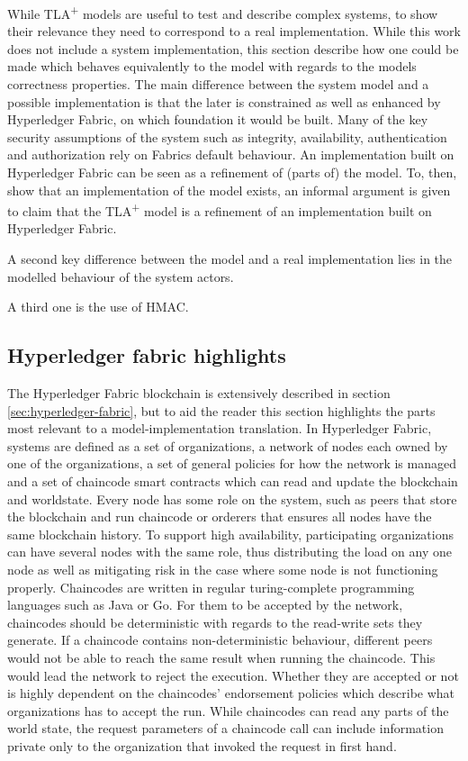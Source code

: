 \documentclass[english, biblatex, digitaloutput]{kththesis}
\begin{document}
While TLA\textsuperscript+ models are useful to test and describe complex systems, to show their relevance they need to correspond to a real implementation. While this work does not include a system implementation, this section describe how one could be made which behaves equivalently to the model with regards to the models correctness properties. The main difference between the system model and a possible implementation is that the later is constrained as well as enhanced by Hyperledger Fabric, on which foundation it would be built. Many of the key security assumptions of the system such as integrity, availability, authentication and authorization rely on Fabrics default behaviour. An implementation built on Hyperledger Fabric can be seen as a refinement of (parts of) the model. To, then, show that an implementation of the model exists, an informal argument is given to claim that the TLA\textsuperscript+ model is a refinement of an implementation built on Hyperledger Fabric.

A second key difference between the model and a real implementation lies in the modelled behaviour of the system actors.

A third one is the use of HMAC.

\subsection{Hyperledger fabric highlights}
\label{subsec:hyperledger-highlights}

The Hyperledger Fabric blockchain is extensively described in section \ref{sec:hyperledger-fabric}, but to aid the reader this section highlights the parts most relevant to a model-implementation translation. In Hyperledger Fabric, systems are defined as a set of organizations, a network of nodes each owned by one of the organizations, a set of general policies for how the network is managed and a set of chaincode smart contracts which can read and update the blockchain and worldstate. Every node has some role on the system, such as peers that store the blockchain and run chaincode or orderers that ensures all nodes have the same blockchain history. To support high availability, participating organizations can have several nodes with the same role, thus distributing the load on any one node as well as mitigating risk in the case where some node is not functioning properly. Chaincodes are written in regular turing-complete programming languages such as Java or Go. For them to be accepted by the network, chaincodes should be deterministic with regards to the read-write sets they generate. If a chaincode contains non-deterministic behaviour, different peers would not be able to reach the same result when running the chaincode. This would lead the network to reject the execution. Whether they are accepted or not is highly dependent on the chaincodes' endorsement policies which describe what organizations has to accept the run. While chaincodes can read any parts of the world state, the request parameters of a chaincode call can include information private only to the organization that invoked the request in first hand.
\end{document}
